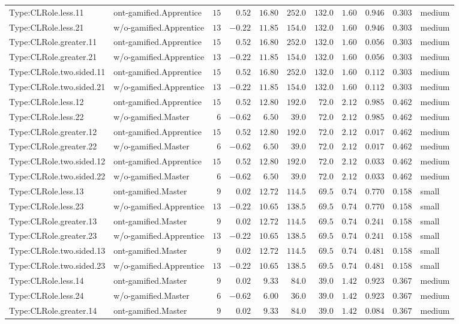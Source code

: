\documentclass[6pt,a4paper]{article}
\begin{document}
{\begin{longtable}{llrrrrrrrrl}
Type:CLRole.less.11&ont-gamified.Apprentice&$15$&$ 0.52$&$16.80$&$252.0$&$132.0$&$1.60$&$0.946$&$0.303$&medium\tabularnewline
Type:CLRole.less.21&w/o-gamified.Apprentice&$13$&$-0.22$&$11.85$&$154.0$&$132.0$&$1.60$&$0.946$&$0.303$&medium\tabularnewline
Type:CLRole.greater.11&ont-gamified.Apprentice&$15$&$ 0.52$&$16.80$&$252.0$&$132.0$&$1.60$&$0.056$&$0.303$&medium\tabularnewline
Type:CLRole.greater.21&w/o-gamified.Apprentice&$13$&$-0.22$&$11.85$&$154.0$&$132.0$&$1.60$&$0.056$&$0.303$&medium\tabularnewline
Type:CLRole.two.sided.11&ont-gamified.Apprentice&$15$&$ 0.52$&$16.80$&$252.0$&$132.0$&$1.60$&$0.112$&$0.303$&medium\tabularnewline
Type:CLRole.two.sided.21&w/o-gamified.Apprentice&$13$&$-0.22$&$11.85$&$154.0$&$132.0$&$1.60$&$0.112$&$0.303$&medium\tabularnewline
Type:CLRole.less.12&ont-gamified.Apprentice&$15$&$ 0.52$&$12.80$&$192.0$&$ 72.0$&$2.12$&$0.985$&$0.462$&medium\tabularnewline
Type:CLRole.less.22&w/o-gamified.Master&$ 6$&$-0.62$&$ 6.50$&$ 39.0$&$ 72.0$&$2.12$&$0.985$&$0.462$&medium\tabularnewline
Type:CLRole.greater.12&ont-gamified.Apprentice&$15$&$ 0.52$&$12.80$&$192.0$&$ 72.0$&$2.12$&$0.017$&$0.462$&medium\tabularnewline
Type:CLRole.greater.22&w/o-gamified.Master&$ 6$&$-0.62$&$ 6.50$&$ 39.0$&$ 72.0$&$2.12$&$0.017$&$0.462$&medium\tabularnewline
Type:CLRole.two.sided.12&ont-gamified.Apprentice&$15$&$ 0.52$&$12.80$&$192.0$&$ 72.0$&$2.12$&$0.033$&$0.462$&medium\tabularnewline
Type:CLRole.two.sided.22&w/o-gamified.Master&$ 6$&$-0.62$&$ 6.50$&$ 39.0$&$ 72.0$&$2.12$&$0.033$&$0.462$&medium\tabularnewline
Type:CLRole.less.13&ont-gamified.Master&$ 9$&$ 0.02$&$12.72$&$114.5$&$ 69.5$&$0.74$&$0.770$&$0.158$&small\tabularnewline
Type:CLRole.less.23&w/o-gamified.Apprentice&$13$&$-0.22$&$10.65$&$138.5$&$ 69.5$&$0.74$&$0.770$&$0.158$&small\tabularnewline
Type:CLRole.greater.13&ont-gamified.Master&$ 9$&$ 0.02$&$12.72$&$114.5$&$ 69.5$&$0.74$&$0.241$&$0.158$&small\tabularnewline
Type:CLRole.greater.23&w/o-gamified.Apprentice&$13$&$-0.22$&$10.65$&$138.5$&$ 69.5$&$0.74$&$0.241$&$0.158$&small\tabularnewline
Type:CLRole.two.sided.13&ont-gamified.Master&$ 9$&$ 0.02$&$12.72$&$114.5$&$ 69.5$&$0.74$&$0.481$&$0.158$&small\tabularnewline
Type:CLRole.two.sided.23&w/o-gamified.Apprentice&$13$&$-0.22$&$10.65$&$138.5$&$ 69.5$&$0.74$&$0.481$&$0.158$&small\tabularnewline
Type:CLRole.less.14&ont-gamified.Master&$ 9$&$ 0.02$&$ 9.33$&$ 84.0$&$ 39.0$&$1.42$&$0.923$&$0.367$&medium\tabularnewline
Type:CLRole.less.24&w/o-gamified.Master&$ 6$&$-0.62$&$ 6.00$&$ 36.0$&$ 39.0$&$1.42$&$0.923$&$0.367$&medium\tabularnewline
Type:CLRole.greater.14&ont-gamified.Master&$ 9$&$ 0.02$&$ 9.33$&$ 84.0$&$ 39.0$&$1.42$&$0.084$&$0.367$&medium\tabularnewline

\end{longtable}}
\end{document}
